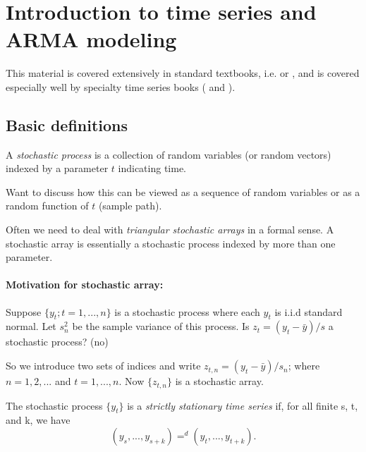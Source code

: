 

\section{Introduction to time series and ARMA modeling}

This material is covered extensively in standard textbooks,
i.e. \citet{Ha00} or \citet{Gr12}, and is covered especially well by
specialty time series books (\citealp{BD91} and \citealp{Ha94}).

\subsection{Basic definitions}

\begin{defn}
  A \emph{stochastic process} is a collection of random variables (or
  random vectors) indexed by a parameter $t$ indicating time.
\end{defn}

Want to discuss how this can be viewed as a sequence of random
variables or as a random function of $t$ (sample path).

Often we need to deal with \emph{triangular stochastic arrays} in a
formal sense. A stochastic array is essentially a stochastic process
indexed by more than one parameter.

\paragraph{Motivation for stochastic array:}
Suppose $\{y_t; t=1,...,n\}$ is a stochastic process where each $y_t$
is i.i.d standard normal. Let $s^2_n$ be the sample variance of this
process. Is $z_t = (y_t - \bar y) / s$ a stochastic process?  (no)

So we introduce two sets of indices and write $z_{t,n} = (y_t - \bar
y) / s_n$; where $n = 1,2,...$ and $t = 1,...,n$.  Now $\{z_{t,n}\}$
is a stochastic array.

\begin{defn}
  The stochastic process $\{y_t\}$ is a \emph{strictly stationary time
    series} if, for all finite s, t, and k, we have
  \begin{equation*}
    (y_s,...,y_{s+k}) =^d (y_t,...,y_{t+k}).
  \end{equation*}
\end{defn}

